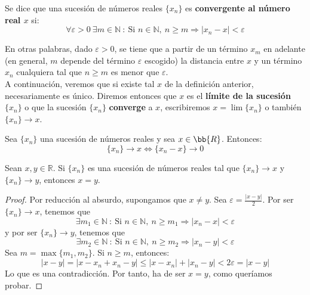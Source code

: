 \begin{definicion}
    Se dice que una sucesión de números reales  $\{x_n\}$ es \textbf{convergente al número real $x$} si:
    \begin{equation*}
        \forall \varepsilon > 0 ~\exists m \in \mathbb{N} ~:~ \text{Si $n \in \mathbb{N}$},~n \geq m \Longrightarrow \left| x_n - x \right| < \varepsilon
    \end{equation*}
\end{definicion}

En otras palabras, dado $\varepsilon > 0$, se tiene que a partir de un término $x_m$ en adelante (en general, $m$ depende del término
$\varepsilon$ escogido) la distancia entre $x$ y un término $x_n$ cualquiera tal que $n \geq m$ es menor que $\varepsilon$.\\


A continuación, veremos que si existe tal $x$ de la definición anterior, necesariamente es único. Diremos entonces que
$x$ es el \textbf{límite de la sucesión $\{x_n\}$} o que la sucesión $\{x_n\}$ \textbf{converge}
a $x$, escribiremos $x= \lim \{x_n\}$ o también $\{x_n\}\longrightarrow x$.
\begin{lema}\label{lema:5.1.3}
    Sea $\{x_n\}$ una sucesión de números reales y sea $x\in \bb{R}$. Entonces:
    $$\{x_n\} \longrightarrow  x \Longleftrightarrow \{x_n - x\} \longrightarrow 0$$
\end{lema}

\begin{prop}
    Sean $x,y \in \mathbb{R}$. Si $\{x_n\}$ es una sucesión de números reales tal que $\{x_n\}\longrightarrow x$ y $\{x_n\}\longrightarrow y$, entonces $x=y$.
\end{prop}
\begin{proof}
    Por reducción al absurdo, supongamos que $x \neq y$. Sea $\varepsilon = \frac{\left| x-y \right|}{2}$.
    Por ser $\{x_n\} \longrightarrow x$, tenemos que
    \begin{equation*}
        \exists m_1 \in \mathbb{N} ~:~ \text{Si $n \in \mathbb{N}$},~n \geq m_1 \Longrightarrow \left| x_n - x \right| < \varepsilon
    \end{equation*}
    y por ser $\{x_n\} \longrightarrow y$, tenemos que
    \begin{equation*}
        \exists m_2 \in \mathbb{N} ~:~ \text{Si $n \in \mathbb{N}$},~n \geq m_2 \Longrightarrow \left| x_n - y \right| < \varepsilon
    \end{equation*}
    Sea $m=\max \{m_1,m_2\}$. Si $n \geq m$, entonces:
    \begin{equation*}
        \left| x-y \right| = \left| x-x_n+x_n-y \right| \leq \left| x-x_n \right| + \left|x_n-y \right| < 2 \varepsilon = \left| x-y \right|
    \end{equation*}
    Lo que es una contradicción. Por tanto, ha de ser $x=y$, como queríamos probar.
\end{proof}

